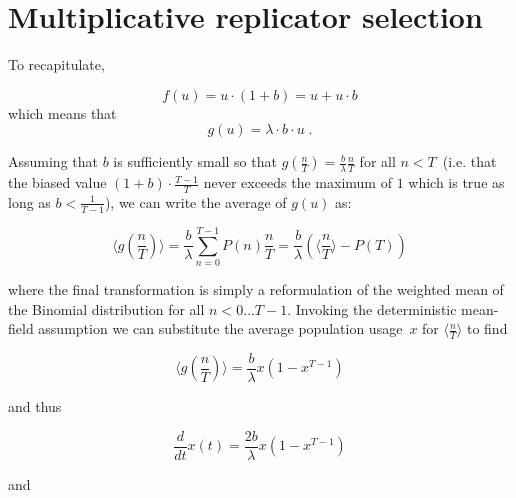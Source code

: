 \section{Multiplicative replicator selection}

To recapitulate,

$$f(u) = u\cdot(1+b) = u + u\cdot b$$
which means that
$$g(u) = \lambda\cdot b\cdot u\;.$$

Assuming that $b$ is sufficiently small so that $g(\frac{n}{T})=\frac{b}{\lambda}\frac{n}{T}$ for all $n<T$~(i.e. that the biased value $(1+b)\cdot\frac{T-1}{T}$ never exceeds the maximum of $1$ which is true as long as $b<\frac{1}{T-1}$), we can write the average of $g(u)$ as:

$$\langle g(\frac{n}{T})\rangle=\frac{b}{\lambda}\sum_{n=0}^{T-1} P(n)\frac{n}{T}=\frac{b}{\lambda}(\langle\frac{n}{T}\rangle - P(T))$$

where the final transformation is simply a reformulation of the weighted mean of the Binomial distribution for all $n<0\ldots T-1$. Invoking the deterministic mean-field assumption we can substitute the average population usage~$x$ for $\langle\frac{n}{T}\rangle$ to find


$$\langle g(\frac{n}{T})\rangle=\frac{b}{\lambda}x(1-x^{T-1})$$

and thus

$$\frac{d}{dt}x(t)=\frac{2b}{\lambda}x(1-x^{T-1})$$

and

